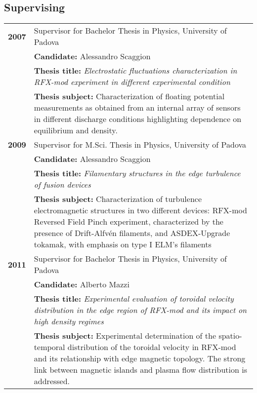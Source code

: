 {\subsection{Supervising}
\begin{longtable}{>{\bfseries}l p{15cm}}
2007 & Supervisor for Bachelor Thesis in Physics, University of Padova \\
 & \textbf{Candidate:} Alessandro Scaggion \\
 & \textbf{Thesis title:} \emph{Electrostatic fluctuations characterization in
   RFX-mod experiment in different experimental condition} \\
 & \textbf{Thesis subject:} Characterization of floating potential
 measurements as obtained from an internal array of sensors in
 different discharge conditions highlighting dependence on
 equilibrium and density. \\
2009 & Supervisor for M.Sci. Thesis in Physics, University of Padova \\
 & \textbf{Candidate:} Alessandro Scaggion \\
& \textbf{Thesis title:} \emph{Filamentary structures in the edge
  turbulence of fusion devices} \\
& \textbf{Thesis subject:} Characterization of turbulence
electromagnetic structures in two different devices: RFX-mod Reversed
Field Pinch experiment, characterized by the presence of
Drift-Alfv\'en filaments, and ASDEX-Upgrade tokamak, with emphasis on
type I ELM's filaments \\
2011 & Supervisor for Bachelor Thesis in Physics, University of Padova \\
 & \textbf{Candidate:} Alberto Mazzi \\
 & \textbf{Thesis title:} \emph{Experimental evaluation of toroidal
   velocity distribution in the edge region of RFX-mod and its impact
   on high density regimes } \\
 & \textbf{Thesis subject:} Experimental determination of the
 spatio-temporal distribution of the toroidal
 velocity  in RFX-mod and its relationship with edge magnetic
 topology. The strong link between magnetic islands and
 plasma flow distribution is addressed.\\

\end{longtable}
}

